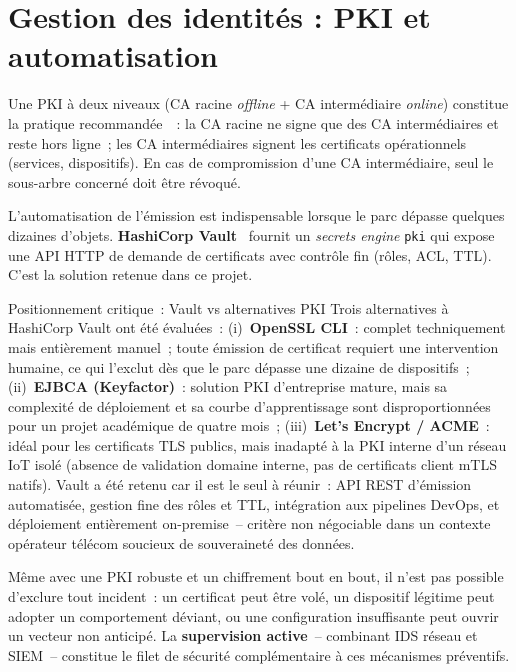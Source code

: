 \section{Gestion des identités : PKI et automatisation}
\label{sec:ea-pki}

Une PKI à deux niveaux (CA racine \emph{offline} + CA intermédiaire \emph{online}) constitue la pratique recommandée~\cite{nist_sp800213}~: la CA racine ne signe que des CA intermédiaires et reste hors ligne~; les CA intermédiaires signent les certificats opérationnels (services, dispositifs). En cas de compromission d'une CA intermédiaire, seul le sous-arbre concerné doit être révoqué.

L'automatisation de l'émission est indispensable lorsque le parc dépasse quelques dizaines d'objets. \textbf{HashiCorp Vault}~\cite{vault_pki} fournit un \emph{secrets engine} \texttt{pki} qui expose une API HTTP de demande de certificats avec contrôle fin (rôles, ACL, TTL). C'est la solution retenue dans ce projet.

\begin{resultbox}{Positionnement critique~: Vault vs alternatives PKI}
Trois alternatives à HashiCorp Vault ont été évaluées~: (i)~\textbf{OpenSSL CLI}~: complet techniquement mais entièrement manuel~; toute émission de certificat requiert une intervention humaine, ce qui l'exclut dès que le parc dépasse une dizaine de dispositifs~; (ii)~\textbf{EJBCA (Keyfactor)}~: solution PKI d'entreprise mature, mais sa complexité de déploiement et sa courbe d'apprentissage sont disproportionnées pour un projet académique de quatre mois~; (iii)~\textbf{Let's Encrypt / ACME}~: idéal pour les certificats TLS publics, mais inadapté à la PKI interne d'un réseau IoT isolé (absence de validation domaine interne, pas de certificats client mTLS natifs). Vault a été retenu car il est le seul à réunir~: API REST d'émission automatisée, gestion fine des rôles et TTL, intégration aux pipelines DevOps, et déploiement entièrement on-premise~-- critère non négociable dans un contexte opérateur télécom soucieux de souveraineté des données.
\end{resultbox}

Même avec une PKI robuste et un chiffrement bout en bout, il n'est pas possible d'exclure tout incident~: un certificat peut être volé, un dispositif légitime peut adopter un comportement déviant, ou une configuration insuffisante peut ouvrir un vecteur non anticipé. La \textbf{supervision active}~-- combinant IDS réseau et SIEM~-- constitue le filet de sécurité complémentaire à ces mécanismes préventifs.

